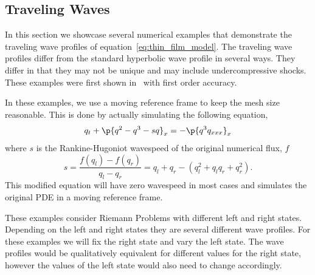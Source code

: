 \subsection{Traveling Waves}\label{ssec:bertozzi_cases}
In this section we showcase several numerical examples that demonstrate the traveling
wave profiles of equation~\eqref{eq:thin_film_model}.
The traveling wave profiles differ from the standard hyperbolic wave profile in
several ways.
They differ in that they may not be unique and may include undercompressive shocks.
These examples were first shown in~\cite{article:Bertozzi1999} with first order accuracy.

In these examples, we use a moving reference frame to keep the mesh size reasonable.
This is done by actually simulating the following equation,
\begin{equation}
q_t + \p{q^2 - q^3 - sq}_x = -\p{q^3 q_{xxx}}_x \label{eq:thin_film_moving_reference_frame}
\end{equation}
where \(s\) is the Rankine-Hugoniot wavespeed of the original numerical flux, \(f\)
\begin{equation}
s = \frac{f(q_l) - f(q_r)}{q_l - q_r} = q_l + q_r - (q_l^2 + q_l q_r + q_r^2).\label{eq:ranking_hugoniot}
\end{equation}
This modified equation will have zero wavespeed in most cases and simulates the
original PDE in a moving reference frame.

These examples consider Riemann Problems with different left and right states.
Depending on the left and right states they are several different wave profiles.
For these examples we will fix the right state and vary the left state.
The wave profiles would be qualitatively equivalent for different values for the right
state, however the values of the left state would also need to change accordingly.

